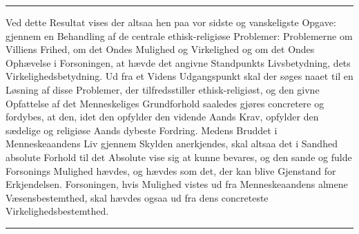 \begin{center}\rule{2cm}{0.4pt}\end{center}

Ved dette Resultat vises der altsaa hen paa vor sidste og vanskeligste Opgave:
gjennem en Behandling af de centrale ethisk-religiøse Problemer: Problemerne om
Villiens Frihed, om det Ondes Mulighed og Virkelighed og om det Ondes Ophævelse i
Forsoningen, at hævde det angivne Standpunkts Livsbetydning, dets
Virkelighedsbetydning. Ud fra et Videns Udgangspunkt skal der søges naaet til en
Løsning af disse Problemer, der tilfredsstiller ethisk-religiøst, og den givne
Opfattelse af
 det Menneskeliges Grundforhold saaledes gjøres concretere og fordybes, at den, idet
den opfylder den vidende Aands Krav, opfylder den sædelige og religiøse Aands
dybeste Fordring. Medens Bruddet i Menneskeaandens Liv gjennem Skylden anerkjendes,
skal altsaa det i Sandhed absolute Forhold til det Absolute vise sig at kunne
bevares, og den sande og fulde Forsonings Mulighed hævdes, og hævdes som det, der
kan blive Gjenstand for Erkjendelsen. Forsoningen, hvis Mulighed vistes ud fra
Menneskeaandens almene Væsensbestemthed, skal hævdes ogsaa ud fra dens concreteste
Virkelighedsbestemthed.

\begin{center}\rule{2cm}{0.4pt}\end{center}

